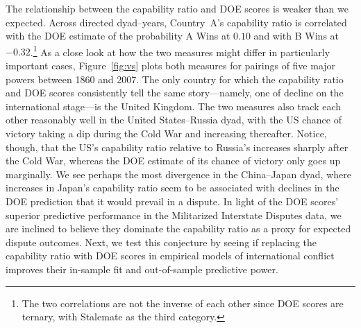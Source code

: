 The relationship between the capability ratio and DOE scores is weaker than we expected.
Across directed dyad--years, Country~A's capability ratio is correlated with the DOE estimate of the probability A Wins at $0.10$ and with B Wins at $-0.32$.\footnote{
  The two correlations are not the inverse of each other since DOE scores are ternary, with Stalemate as the third category.
}
As a close look at how the two measures might differ in particularly important cases, Figure~\ref{fig:vs} plots both measures for pairings of five major powers between 1860 and 2007.
The only country for which the capability ratio and DOE scores consistently tell the same story---namely, one of decline on the international stage---is the United Kingdom.
The two measures also track each other reasonably well in the United States--Russia dyad, with the US chance of victory taking a dip during the Cold War and increasing thereafter.
Notice, though, that the US's capability ratio relative to Russia's increases sharply after the Cold War, whereas the DOE estimate of its chance of victory only goes up marginally.
We see perhaps the most divergence in the China--Japan dyad, where increases in Japan's capability ratio seem to be associated with declines in the DOE prediction that it would prevail in a dispute.
In light of the DOE scores' superior predictive performance in the Militarized Interstate Disputes data, we are inclined to believe they dominate the capability ratio as a proxy for expected dispute outcomes.
Next, we test this conjecture by seeing if replacing the capability ratio with DOE scores in empirical models of international conflict improves their in-sample fit and out-of-sample predictive power.

